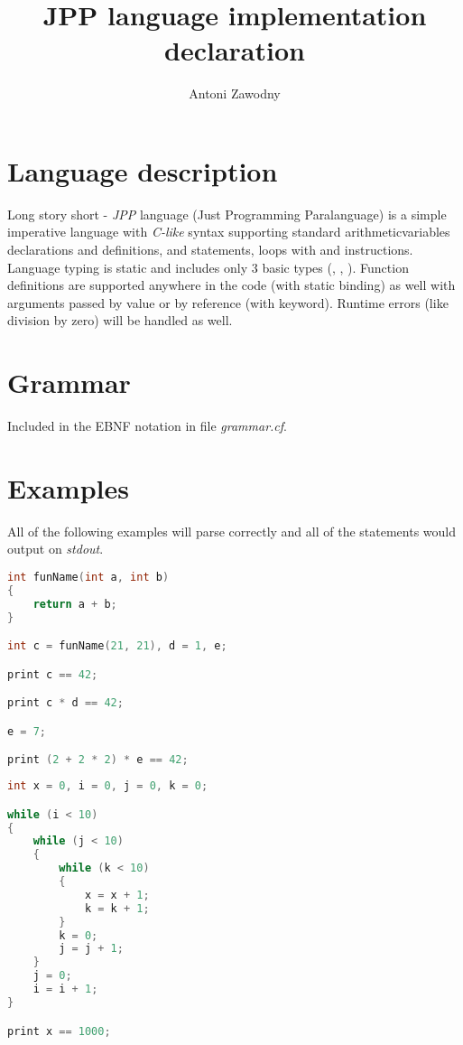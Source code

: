 \documentclass[11pt,a4paper]{article}
\title{JPP language implementation declaration}
\author{Antoni Zawodny}
\date{}
\newcommand{\jpp}[1]{\textit{\color{blue}{#1}}}
\begin{document}
\maketitle
\section*{Language description}
Long story short - \emph{JPP} language (Just Programming Paralanguage) is a simple imperative language with \emph{C-like} syntax supporting standard arithmeticvariables declarations and definitions, \jpp{if} and \jpp{if-else} statements, \jpp{while} loops with \jpp{break} and \jpp{continue} instructions. Language typing is static and includes only 3 basic types (\jpp{int}, \jpp{bool}, \jpp{string}). Function definitions are supported anywhere in the code (with static binding) as well with arguments passed by value or by reference (with \jpp{ref} keyword). Runtime errors (like division by zero) will be handled as well.

\section*{Grammar}
Included in the EBNF notation in file \emph{grammar.cf}.

\section*{Examples}
All of the following examples will parse correctly and all of the \jpp{print} statements would output \jpp{True} on \emph{stdout}.

\begin{lstlisting}[language=C, caption=Simple expressions]
int funName(int a, int b)
{
    return a + b;
}

int c = funName(21, 21), d = 1, e;

print c == 42;

print c * d == 42;

e = 7;

print (2 + 2 * 2) * e == 42;
\end{lstlisting}

\begin{lstlisting}[language=C, caption=Simple loops]
int x = 0, i = 0, j = 0, k = 0;

while (i < 10)
{
    while (j < 10)
    {
        while (k < 10)
        {
            x = x + 1;
            k = k + 1;
        }
        k = 0;
        j = j + 1;
    }
    j = 0;
    i = i + 1;
}

print x == 1000;
\end{lstlisting}
\end{document}
